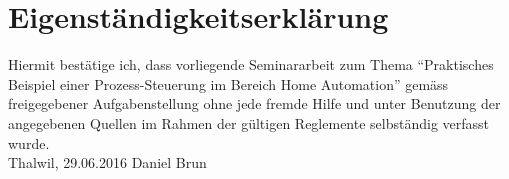 
\chapter*{Eigenständigkeitserklärung}
\thispagestyle{empty}
%
Hiermit bestätige ich, dass vorliegende Seminararbeit zum Thema "`Praktisches Beispiel einer Prozess-Steuerung im Bereich Home Automation"'
gemäss freigegebener Aufgabenstellung ohne jede fremde Hilfe und unter Benutzung der angegebenen Quellen im Rahmen der gültigen Reglemente selbständig verfasst wurde. 
%
\mbox{}\vspace{4\baselineskip}\\
%
Thalwil, 29.06.2016 \hfill Daniel Brun
\clearpage\mbox{}\thispagestyle{empty}


%

